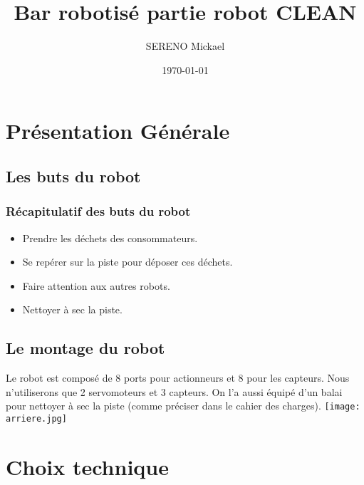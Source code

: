 \documentclass{beamer}
\title{Bar robotisé partie robot CLEAN}
\author{SERENO Mickael}
\institute{Lycée Jean Macé}
\date{\today}
\begin{document}
    \begin{frame}
		\titlepage
    \end{frame}

	\section{Présentation Générale}
	\subsection{Les buts du robot}
		\begin{frame}
			\frametitle{Récapitulatif des buts du robot}
			\transdissolve
			\begin{itemize}
				\pause
				\item Prendre les déchets des consommateurs.
				\pause
				\item Se repérer sur la piste pour déposer ces déchets.
				\pause
				\item Faire attention aux autres robots.
				\pause
				\item Nettoyer à sec la piste.
			\end{itemize}
		\end{frame}

	\subsection{Le montage du robot}
		\begin{frame}
			\transdissolve
			\transduration{20}
			\begin{center}
				Le robot est composé de 8 ports pour actionneurs et 8 pour les capteurs. Nous n'utiliserons que 2 servomoteurs et 3 capteurs. On l'a aussi équipé d'un balai pour nettoyer à sec la piste (comme préciser dans le cahier des charges).
				\pause
				\texttt{[image: arriere.jpg]}
			\end{center}
		\end{frame}
	\section{Choix technique}
\end{document}
